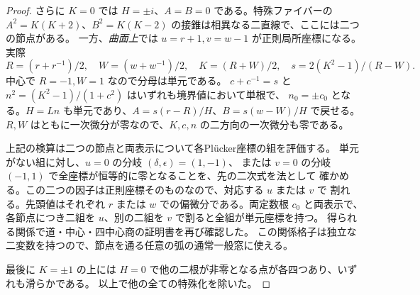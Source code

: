 \begin{proof}
さらに $K=0$ では $H=\pm i$、$A=B=0$ である。特殊ファイバーの
$A^2=K(K+2)$、$B^2=K(K-2)$ の接錐は相異なる二直線で、ここには二つの節点がある。
一方、\emph{曲面上}では $u=r+1,v=w-1$ が正則局所座標になる。実際
\[
 R=(r+r^{-1})/2,\quad W=(w+w^{-1})/2,\quad
 K=(R+W)/2,\quad s=2(K^2-1)/(R-W).
\]
中心で $R=-1,W=1$ なので分母は単元である。
$c+c^{-1}=s$ と $n^2=(K^2-1)/(1+c^2)$ はいずれも境界値において単根で、
$n_0=\pm c_0$ となる。$H=Ln$ も単元であり、$A=s(r-R)/H$、$B=s(w-W)/H$ で戻せる。
$R,W$ はともに一次微分が零なので、$K,c,n$ の二方向の一次微分も零である。

上記の検算は二つの節点と両表示について各Pl\"ucker座標の組を評価する。
単元がない組に対し、$u=0$ の分岐 $(\delta,\epsilon)=(1,-1)$、
または $v=0$ の分岐 $(-1,1)$ で全座標が恒等的に零となることを、先の二次式を法として
確かめる。この二つの因子は正則座標そのものなので、対応する $u$ または $v$ で
割れる。先頭値はそれぞれ $r$ または $w$ での偏微分である。両定数根 $c_0$ と両表示で、
各節点につき二組を $u$、別の二組を $v$ で割ると全組が単元座標を持つ。
得られる関係で道・中心・四中心商の証明書を再び確認した。
この関係格子は独立な二変数を持つので、節点を通る任意の弧の通常一般窓に使える。

最後に $K=\pm1$ の上には $H=0$ で他の二根が非零となる点が各四つあり、いずれも滑らかである。
以上で他の全ての特殊化を除いた。
\end{proof}
